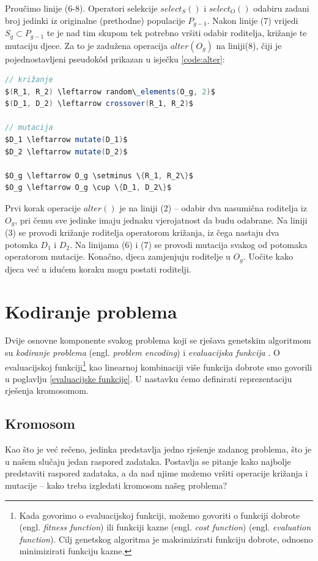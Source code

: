 \documentclass[times, utf8, zavrsni]{fer}
\begin{document}
Proučimo linije (6-8). Operatori selekcije $select_S()$ i $select_O()$ odabiru zadani broj jedinki iz originalne (prethodne) populacije $P_{g-1}$. Nakon linije (7) vrijedi $S_g \subset P_{g-1}$ te je nad tim skupom tek potrebno vršiti odabir roditelja, križanje te mutaciju djece. Za to je zadužena operacija $alter(O_g)$ na liniji(8), čiji je pojednostavljeni pseudok{\^o}d prikazan u isječku \ref{code:alter}:

\begin{lstlisting}[language=java, caption=Operacija alter($O_g$), label={code:alter}, mathescape]
// križanje
$(R_1, R_2) \leftarrow random\_elements(O_g, 2)$
$(D_1, D_2) \leftarrow crossover(R_1, R_2)$

// mutacija
$D_1 \leftarrow mutate(D_1)$
$D_2 \leftarrow mutate(D_2)$

$O_g \leftarrow O_g \setminus \{R_1, R_2\}$
$O_g \leftarrow O_g \cup \{D_1, D_2\}$
\end{lstlisting}

Prvi korak operacije $alter()$ je na liniji (2) -- odabir dva nasumična roditelja iz $O_g$, pri čemu sve jedinke imaju jednaku vjerojatnost da budu odabrane. Na liniji (3) se provodi križanje roditelja operatorom križanja, iz čega nastaju dva potomka $D_1$ i $D_2$. Na linijama (6) i (7) se provodi mutacija svakog od potomaka operatorom mutacije. Konačno, djeca zamjenjuju roditelje u $O_g$. Uočite kako djeca već u idućem koraku mogu postati roditelji.

\section{Kodiranje problema}\label{kodiranje problema}
Dvije osnovne komponente svakog problema koji se rješava genetskim algoritmom su \textit{kodiranje problema} (engl. \textit{problem encoding}) i \textit{evaluacijska funkcija} \citep{whitley1994genetic}. O evaluacijskoj funkciji\footnote{Kada govorimo o evaluacijskoj funkciji, možemo govoriti o funkciji dobrote (engl. \textit{fitness function}) ili funkciji kazne (engl. \textit{cost function}) (engl. \textit{evaluation function}). Cilj genetskog algoritma je maksimizirati funkciju dobrote, odnosno minimizirati funkciju kazne.} kao linearnoj kombinaciji više funkcija dobrote smo govorili u poglavlju \ref{evaluacijske funkcije}. U nastavku ćemo definirati reprezentaciju rješenja kromosomom.

\subsection{Kromosom}\label{kromosom}
Kao što je već rečeno, jedinka predstavlja jedno rješenje zadanog problema, što je u našem slučaju jedan raspored zadataka. Postavlja se pitanje kako najbolje predstaviti raspored zadataka, a da nad njime možemo vršiti operacije križanja i mutacije -- kako treba izgledati kromosom našeg problema?
\end{document}

